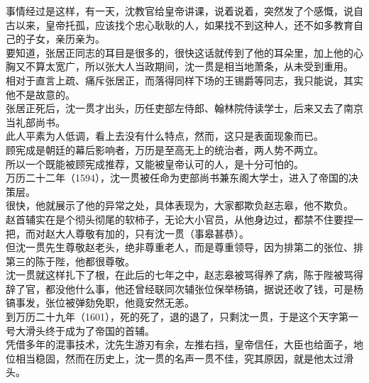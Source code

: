 \begin{multicols}{\theparacolNo}
事情经过是这样，有一天，沈教官给皇帝讲课，说着说着，突然发了个感慨，说自古以来，皇帝托孤，应该找个忠心耿耿的人，如果找不到这种人，还不如多教育自己的子女，亲历亲为。\\

要知道，张居正同志的耳目是很多的，很快这话就传到了他的耳朵里，加上他的心胸又不算太宽广，所以张大人当政期间，沈一贯是相当地萧条，从未受到重用。\\

相对于直言上疏、痛斥张居正，而落得同样下场的王锡爵等同志，我只能说，其实他不是故意的。\\

张居正死后，沈一贯才出头，历任吏部左侍郎、翰林院侍读学士，后来又去了南京当礼部尚书。\\

此人平素为人低调，看上去没有什么特点，然而，这只是表面现象而已。\\

顾宪成是朝廷的幕后影响者，万历是至高无上的统治者，两人势不两立。\\

所以一个既能被顾宪成推荐，又能被皇帝认可的人，是十分可怕的。\\

万历二十二年（1594），沈一贯被任命为吏部尚书兼东阁大学士，进入了帝国的决策层。\\

很快，他就展示了他的异常之处，具体表现为，大家都欺负赵志皋，他不欺负。\\

赵首辅实在是个彻头彻尾的软柿子，无论大小官员，从他身边过，都禁不住要捏一把，而对赵大人尊敬有加的，只有沈一贯（事皋甚恭）。\\

但沈一贯先生尊敬赵老头，绝非尊重老人，而是尊重领导，因为排第二的张位、排第三的陈于陛，他都很尊敬。\\

沈一贯就这样扎下了根，在此后的七年之中，赵志皋被骂得养了病，陈于陛被骂得辞了官，都没他什么事，他还曾经联同次辅张位保举杨镐，据说还收了钱，可是杨镐事发，张位被弹劾免职，他竟安然无恙。\\

到万历二十九年（1601），死的死了，退的退了，只剩沈一贯，于是这个天字第一号大滑头终于成为了帝国的首辅。\\

凭借多年的混事技术，沈先生游刃有余，左推右挡，皇帝信任，大臣也给面子，地位相当稳固，然而在历史上，沈一贯的名声一贯不佳，究其原因，就是他太过滑头。\\


\end{multicols}
